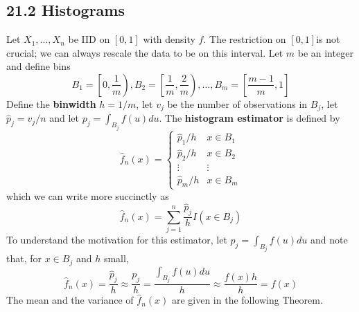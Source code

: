 \subsection*{21.2 Histograms}\label{histograms}
Let \(X_{1}, \dots, X_{n}\) be IID on \([0, 1]\) with density \(f\). The restriction on \([0, 1]\)is not crucial; we can always rescale the data to be on this interval. Let \(m\) be an integer and define bins
\[
B_{1} = \left[0, \frac{1}{m} \right), B_{2} = \left[\frac{1}{m}, \frac{2}{m} \right), \dots, B_m = \left[\frac{m - 1}{m}, 1 \right]
\]
Define the \textbf{binwidth} \(h = 1 / m\), let \(v_{j}\) be the number of observations in \(B_{j}\), let \(\hat{p}_{j} = v_{j} / n\) and let \(p_{j} = \int_{B_{j}} f(u) du\).
The \textbf{histogram estimator} is defined by
\[
\hat{f}_{n}(x) = \begin{cases}
\hat{p}_{1} / h & x \in B_{1} \\
\hat{p}_{2} / h & x \in B_{2} \\
\vdots & \vdots\\
\hat{p}_m / h & x \in B_m
\end{cases}
\]
which we can write more succinctly as
\[
\hat{f}_{n}(x) = \sum_{j=1}^{n} \frac{\hat{p}_{j}}{h} I(x \in B_{j})
\]
To understand the motivation for this estimator, let \(p_{j} = \int_{B_{j}} f(u) du\) and note that, for \(x \in B_{j}\) and \(h\) small,
\[
\hat{f}_{n}(x) = \frac{\hat{p}_{j}}{h} \approx \frac{p_{j}}{h} = \frac{\int_{B_{j}} f(u) du}{h} \approx \frac{f(x) h}{h} = f(x)
\]
The mean and the variance of \(\hat{f}_{n}(x)\) are given in the following Theorem.

